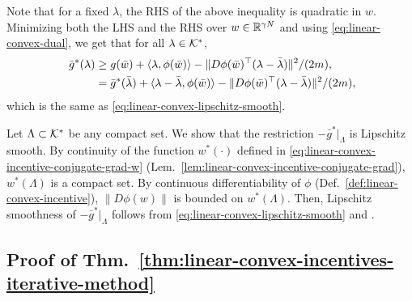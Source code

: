 Note that for a fixed $\lambda$, the RHS of the above inequality is quadratic in $w$.
Minimizing both the LHS and the RHS over $w \in \mathbb{R}^{\gamma N}$ and using \eqref{eq:linear-convex-dual}, we get that for all $\lambda \in \mathcal{K}^*$, %
\begin{equation*}
\begin{split}
    \bar{g}^*(\lambda) & \geq g(\bar{w}) + \langle \lambda, \phi(\bar{w})\rangle - \lVert D \phi(\bar{w})^\top (\lambda - \bar{\lambda}) \rVert^2 / (2m), \\
    & = \bar{g}^*(\bar{\lambda}) + \langle \lambda - \bar{\lambda}, \phi(\bar{w})\rangle - \lVert D \phi(\bar{w})^\top (\lambda - \bar{\lambda}) \rVert^2 / (2m), \!\!
\end{split}
\end{equation*}
which is the same as \eqref{eq:linear-convex-lipschitz-smooth}.

Let $\Lambda \subset \mathcal{K}^*$ be any compact set.
We show that the restriction $-\bar{g}^*|_{\Lambda}$ is Lipschitz smooth.
By continuity of the function $w^*(\cdot)$ defined in \eqref{eq:linear-convex-incentive-conjugate-grad-w} (Lem.~\ref{lem:linear-convex-incentive-conjugate-grad}), $w^*(\Lambda)$ is a compact set.
By continuous differentiability of $\phi$ (Def.~\ref{def:linear-convex-incentive}), $\lVert D\phi(w)\rVert$ is bounded on $w^*(\Lambda)$.
Then, Lipschitz smoothness of $-\bar{g}^*|_{\Lambda}$ follows from \eqref{eq:linear-convex-lipschitz-smooth} and \cite[Thm.~2.1.5]{nesterov2018lectures}.


\subsection{Proof of Thm.~\ref{thm:linear-convex-incentives-iterative-method}}
\label{subapp:proof-linear-convex-incentives-iterative-method}


